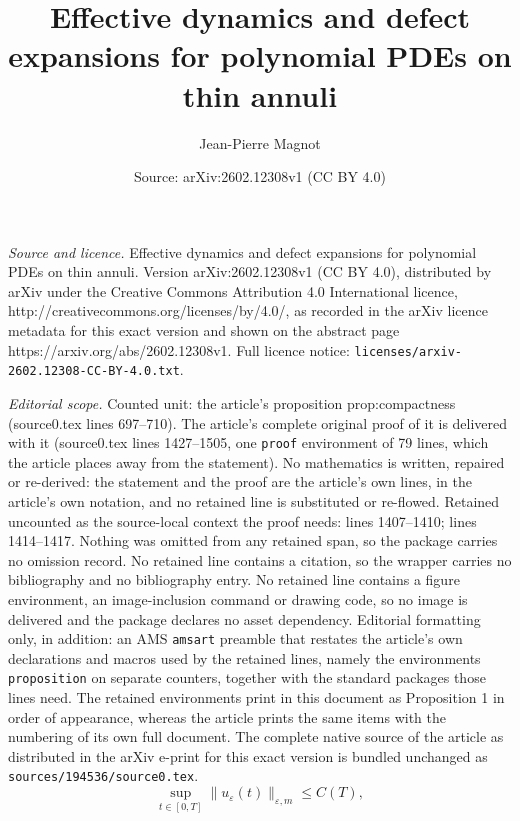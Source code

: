 \documentclass[10pt,a4paper]{amsart}
\title{Effective dynamics and defect expansions for polynomial PDEs on thin annuli}
\author{Jean-Pierre Magnot}
\date{Source: arXiv:2602.12308v1 (CC BY 4.0)}
\begin{document}
\maketitle

\noindent\emph{Source and licence.} Effective dynamics and defect expansions for polynomial PDEs on thin annuli. Version arXiv:2602.12308v1 (CC BY 4.0), distributed by arXiv under the Creative Commons Attribution 4.0 International licence, http://creativecommons.org/licenses/by/4.0/, as recorded in the arXiv licence metadata for this exact version and shown on the abstract page https://arxiv.org/abs/2602.12308v1. Full licence notice: \texttt{licenses/arxiv-2602.12308-CC-BY-4.0.txt}.\par\smallskip

\noindent\textit{Editorial scope.} Counted unit: the article's proposition prop:compactness (source0.tex lines 697--710). The article's complete original proof of it is delivered with it (source0.tex lines 1427--1505, one \texttt{proof} environment of 79 lines, which the article places away from the statement). No mathematics is written, repaired or re-derived: the statement and the proof are the article's own lines, in the article's own notation, and no retained line is substituted or re-flowed.  Retained uncounted as the source-local context the proof needs: lines 1407--1410; lines 1414--1417.  Nothing was omitted from any retained span, so the package carries no omission record.  No retained line contains a citation, so the wrapper carries no bibliography and no bibliography entry.  No retained line contains a figure environment, an image-inclusion command or drawing code, so no image is delivered and the package declares no asset dependency.  Editorial formatting only, in addition: an AMS \texttt{amsart} preamble that restates the article's own declarations and macros used by the retained lines, namely the environments \texttt{proposition} on separate counters, together with the standard packages those lines need.  The retained environments print in this document as Proposition 1 in order of appearance, whereas the article prints the same items with the numbering of its own full document.  The complete native source of the article as distributed in the arXiv e-print for this exact version is bundled unchanged as \texttt{sources/194536/source0.tex}.
\begin{equation}
\label{eq:unif-bound-proof}
\sup_{t\in[0,T]}\|u_\varepsilon(t)\|_{\varepsilon,m}\le C(T),
\end{equation}
\end{document}
